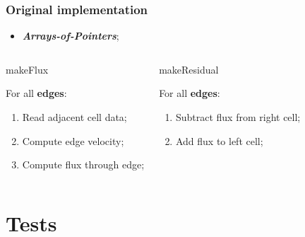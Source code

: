 \documentclass{beamer}
\begin{document}
\begin{frame}
	\frametitle{Original implementation}
	\begin{itemize}
		\item \textbf{\itshape Arrays-of-Pointers};				
	\end{itemize}

	\begin{columns}
		\begin{block}{makeFlux}
			
			For all \textbf{edges}:
			\begin{enumerate}
				\item Read adjacent cell data;	
				\item Compute edge velocity;
				\item Compute flux through edge;				
			\end{enumerate}
		\end{block}

		\begin{block}{makeResidual}
			
			For all \textbf{edges}:
			\begin{enumerate}
				\item Subtract flux from right cell;
				\item Add flux to left cell;
			\end{enumerate}
		\end{block}
	\end{columns}
\end{frame}

\section{Tests}
\end{document}

